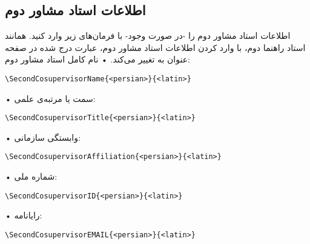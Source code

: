 \documentclass[%
12pt,%
twoside, %
openany, %
notitlepage,%
fleqn,%
]{article}
\numberwithin{equation}{section} %
\begin{document}
\subsection{اطلاعات استاد مشاور دوم}
اطلاعات استاد مشاور دوم را -در صورت وجود- با فرمان‌های زیر وارد کنید\@. همانند استاد راهنما دوم، با وارد کردن اطلاعات استاد مشاور دوم، عبارت  درج شده در صفحه عنوان به  تغییر می‌کند\@. 
• نام کامل استاد مشاور دوم:
\begin{latin}\begin{verbatim}
\SecondCosupervisorName{<persian>}{<latin>}
\end{verbatim} \end{latin}
• سمت یا مرتبه‌ی علمی:
\begin{latin}\begin{verbatim}
\SecondCosupervisorTitle{<persian>}{<latin>}
\end{verbatim} \end{latin}
• وابستگی سازمانی:
\begin{latin}\begin{verbatim}
\SecondCosupervisorAffiliation{<persian>}{<latin>}
\end{verbatim} \end{latin}
• شماره ملی:
\begin{latin}\begin{verbatim}
\SecondCosupervisorID{<persian>}{<latin>}
\end{verbatim} \end{latin}
• رایانامه:
\begin{latin}\begin{verbatim}
\SecondCosupervisorEMAIL{<persian>}{<latin>}
\end{verbatim} \end{latin}
\end{document}
